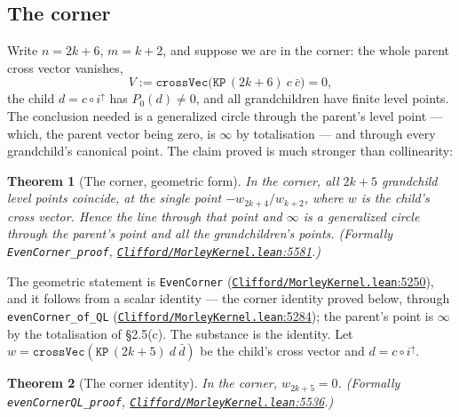 \documentclass[11pt]{article}
\newtheorem{theorem}{Theorem}
\theoremstyle{definition}
\theoremstyle{remark}
\begin{document}
\hypertarget{the-corner}{%
\subsection{The corner}\label{the-corner}}

Write \(n = 2k+6\), \(m = k+2\), and suppose we are in the corner: the whole parent cross vector vanishes,
\[ V := \texttt{crossVec}\big(\texttt{KP}\,(2k+6)\ c\ \bar c\big) = 0, \]
the child \(d = c \circ i^{\uparrow}\) has \(P_0(d) \ne 0\), and all grandchildren have finite level points.
The conclusion needed is a generalized circle through the parent's level point --- which, the parent vector
being zero, is $\infty$ by totalisation --- and through every grandchild's canonical point. The claim proved is
much stronger than collinearity:

\begin{theorem}[The corner, geometric form]
In the corner, all $2k+5$ grandchild level points coincide, at the single point $-w_{2k+4}/w_{k+2}$, where
$w$ is the child's cross vector. Hence the line through that point and $\infty$ is a generalized circle through
the parent's point and all the grandchildren's points. (Formally \texttt{EvenCorner\_\allowbreak proof},
\href{https://github.com/jpbald93/paperl_clifford_chain/blob/e1ae145c2565cc98816635387412edc0a740c27c/Clifford/MorleyKernel.lean\#L5581}{\texttt{Clifford/\allowbreak MorleyKernel.lean}:5581}.)
\end{theorem}

The geometric statement is \texttt{EvenCorner} (\href{https://github.com/jpbald93/paperl_clifford_chain/blob/e1ae145c2565cc98816635387412edc0a740c27c/Clifford/MorleyKernel.lean\#L5250}{\texttt{Clifford/\allowbreak MorleyKernel.lean}:5250}), and it follows from a scalar
identity --- the corner identity proved below, through \texttt{evenCorner\_\allowbreak of\_\allowbreak QL}
(\href{https://github.com/jpbald93/paperl_clifford_chain/blob/e1ae145c2565cc98816635387412edc0a740c27c/Clifford/MorleyKernel.lean\#L5284}{\texttt{Clifford/\allowbreak MorleyKernel.lean}:5284}); the parent's point is $\infty$ by the totalisation of \S{}2.5(c). The
substance is the identity. Let \(w = \texttt{crossVec}(\texttt{KP}\,(2k+5)\ d\ \bar d)\)
be the child's cross vector and \(d = c \circ i^{\uparrow}\).

\begin{theorem}[The corner identity]
In the corner, $w_{2k+5} = 0$. (Formally \texttt{evenCornerQL\_\allowbreak proof},
\href{https://github.com/jpbald93/paperl_clifford_chain/blob/e1ae145c2565cc98816635387412edc0a740c27c/Clifford/MorleyKernel.lean\#L5536}{\texttt{Clifford/\allowbreak MorleyKernel.lean}:5536}.)
\end{theorem}
\end{document}
